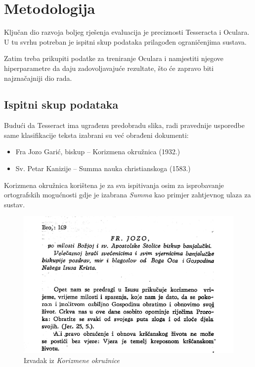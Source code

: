 \documentclass[zavrsnirad]{fer}
\begin{document}
\chapter{Metodologija}
\label{pog:metodologija}

Ključan dio razvoja boljeg rješenja evaluacija je preciznosti Tesseracta i Oculara. U tu svrhu potreban je ispitni skup podataka prilagođen ograničenjima sustava. 

Zatim treba prikupiti podatke za treniranje Oculara i namjestiti njegove hiperparametre da daju zadovoljavajuće rezultate, što će zapravo biti najznačajniji dio rada.


\section{Ispitni skup podataka}

Budući da Tesseract ima ugrađenu predobradu slika, radi pravednije usporedbe same klasifikacije teksta izabrani su već obrađeni dokumenti:

\begin{itemize}
	\item Fra Jozo Garić, biskup – Korizmena okružnica (1932.)
	\item Sv. Petar Kanizije – Summa nauka christianskoga (1583.)
\end{itemize}

Korizmena okružnica korištena je za sva ispitivanja osim za isprobavanje ortografskih mogućnosti gdje je izabrana \textit{Summa} kao primjer zahtjevnog ulaza za sustav.

\begin{figure}[h!]
	\centering
	\includegraphics[width=1.0\linewidth]{Figures/korizmena.png} 
	\caption{Izvadak iz \textit{Korizmene okružnice}}
	\label{slk:korizmena}
\end{figure}
\end{document}
